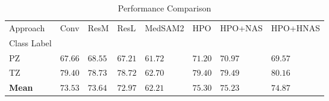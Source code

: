 \begin{table}
\caption{Performance Comparison}
\label{tab:results}
\begin{tabular}{llllllll}
\toprule
Approach & Conv & ResM & ResL & MedSAM2 & HPO & HPO+NAS & HPO+HNAS \\
Class Label &  &  &  &  &  &  &  \\
\midrule
PZ & $67.66$ & $68.55$ & $67.21$ & $61.72$ & $\mathbf{71.20}$ & $70.97$ & $69.57$ \\
TZ & $79.40$ & $78.73$ & $78.72$ & $62.70$ & $79.40$ & $79.49$ & $\mathbf{80.16}$ \\
\textbf{Mean} & $73.53$ & $73.64$ & $72.97$ & $62.21$ & $\mathbf{75.30}$ & $75.23$ & $74.87$ \\
\bottomrule
\end{tabular}
\end{table}
